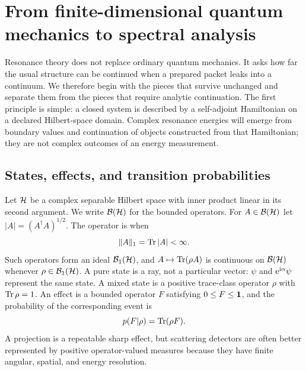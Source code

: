 \section{From finite-dimensional quantum mechanics to spectral analysis}
\label{sec:quantum-foundations}

Resonance theory does not replace ordinary quantum mechanics.  It asks how
far the usual structure can be continued when a prepared packet leaks into a
continuum.  We therefore begin with the pieces that survive unchanged and
separate them from the pieces that require analytic continuation.  The first
principle is simple: a closed system is described by a self-adjoint
Hamiltonian on a declared Hilbert-space domain.  Complex resonance energies
will emerge from boundary values and continuation of objects constructed from
that Hamiltonian; they are not complex outcomes of an energy measurement.

\subsection{States, effects, and transition probabilities}
\label{subsec:states-effects}

Let $\mathcal{H}$ be a complex separable Hilbert space with inner product linear in
its second argument.  We write $\mathcal{B}(\mathcal{H})$ for the bounded operators.
For $A\in\mathcal{B}(\mathcal{H})$ let
$|A|=(A^\dagger A)^{1/2}$.  The operator is  when
\begin{equation}
  \|A\|_1=\operatorname{Tr}|A|<\infty .
  \label{eq:trace-class-definition}
\end{equation}
Such operators form an ideal $\mathcal{B}_{1}(\mathcal{H})$, and
$A\mapsto\operatorname{Tr}(\rho A)$ is continuous on $\mathcal{B}(\mathcal{H})$ whenever
$\rho\in\mathcal{B}_{1}(\mathcal{H})$.  A pure state is a ray, not a particular vector:
$\psi$ and $\mathrm{e}^{\mathrm{i}\alpha}\psi$ represent the same state.  A mixed state is
a positive trace-class operator $\rho$ with $\operatorname{Tr}\rho=1$.  An effect is a
bounded operator $F$ satisfying $0\leq F\leq\mathbf{1}$, and the probability of
the corresponding event is
\begin{equation}
  p(F|\rho)=\operatorname{Tr}(\rho F).
  \label{eq:born-effect}
\end{equation}
A projection is a repeatable sharp effect, but scattering detectors are often
better represented by positive operator-valued measures because they have
finite angular, spatial, and energy resolution.


